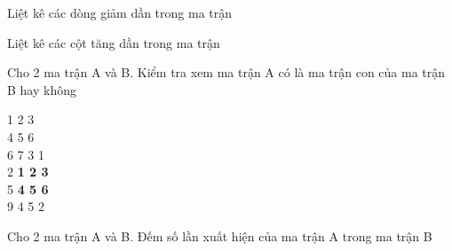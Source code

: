 \begin{problem}
    Liệt kê các dòng giảm dần trong ma trận
\end{problem}
\begin{problem}
    Liệt kê các cột tăng dần trong ma trận
\end{problem}
\begin{problem}
    Cho 2 ma trận A và B. Kiểm tra xem ma trận A có là ma trận con của ma trận B hay không

 1 2 3\\
 4 5 6\\

 6 7 3 1\\
 2 \textbf{1 2 3}\\
 5 \textbf{4 5 6}\\
 9 4 5 2\\
\end{problem}
\begin{problem}
    Cho 2 ma trận A và B. Đếm số lần xuất hiện của ma trận A trong ma trận B
\end{problem}


